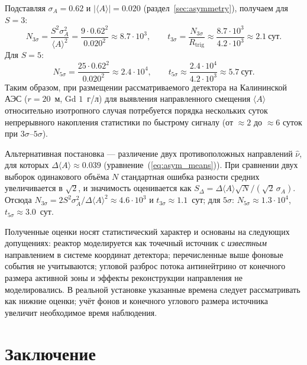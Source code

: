 \documentclass[a4paper,12pt]{extarticle}
\begin{document}
Подставляя $\sigma_A=0.62$ и $|\langle A\rangle|=0.020$ (раздел~\ref{sec:asymmetry}), получаем для $S=3$:
\begin{equation}
    N_{3\sigma}=\frac{S^2\sigma_A^2}{\langle A\rangle^2}
    =\frac{9\cdot 0.62^2}{0.020^2}\approx 8.7\cdot 10^{3},\qquad
    t_{3\sigma}=\frac{N_{3\sigma}}{R_{\mathrm{trig}}}\approx\frac{8.7\cdot 10^{3}}{4.2\cdot 10^{3}}\approx 2.1~\text{сут}.
\end{equation}
Для $S=5$:
\begin{equation}
    N_{5\sigma}=\frac{25\cdot 0.62^2}{0.020^2}\approx 2.4\cdot 10^{4},\qquad
    t_{5\sigma}\approx\frac{2.4\cdot 10^{4}}{4.2\cdot 10^{3}}\approx 5.7~\text{сут}.
\end{equation}
Таким образом, при размещении рассматриваемого детектора на Калининской АЭС ($r=20$~м, Gd $1$~г/л) для выявления направленного смещения $\langle A\rangle$ относительно изотропного случая потребуется порядка нескольких суток непрерывного накопления статистики по быстрому сигналу (от $\approx 2$ до $\approx 6$ суток при $3\sigma$--$5\sigma$).

Альтернативная постановка --- различение двух противоположных направлений $\hat{\nu}$, для которых $\Delta\langle A\rangle\approx 0.039$ (уравнение~(\ref{eq:asym_means})). При сравнении двух выборок одинакового объёма $N$ стандартная ошибка разности средних увеличивается в $\sqrt{2}$, и значимость оценивается как $S_\Delta=\Delta\langle A\rangle\sqrt{N}/(\sqrt{2}\,\sigma_A)$. Отсюда $N_{3\sigma}=2S^2\sigma_A^2/\Delta\langle A\rangle^2\approx 4.6\cdot 10^{3}$ и $t_{3\sigma}\approx 1.1$~сут; для $5\sigma$: $N_{5\sigma}\approx 1.3\cdot 10^{4}$, $t_{5\sigma}\approx 3.0$~сут.

Полученные оценки носят статистический характер и основаны на следующих допущениях: реактор моделируется как точечный источник с \emph{известным} направлением в системе координат детектора; перечисленные выше фоновые события не учитываются; угловой разброс потока антинейтрино от конечного размера активной зоны и эффекты реконструкции направления не моделировались. В реальной установке указанные времена следует рассматривать как нижние оценки; учёт фонов и конечного углового размера источника увеличит необходимое время наблюдения.

\newpage
{}
\section*{Заключение}
\end{document}

